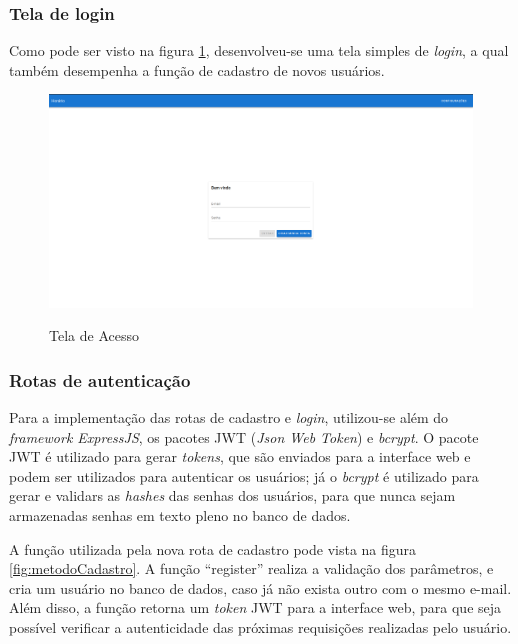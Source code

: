 \newpage
\subsubsection{Tela de login}
Como pode ser visto na figura \ref{fig:login}, desenvolveu-se uma tela simples de \textit{login}, a qual também desempenha a função de cadastro de novos usuários.

\begin{figure}[!htb]
	\centering
	\caption{Tela de Acesso}
	\includegraphics[width=1\textwidth]{./dados/figuras/telaLogin}
	\label{fig:login}
\end{figure}

\subsubsection{Rotas de autenticação}
Para a implementação das rotas de cadastro e \textit{login}, utilizou-se além do \textit{framework ExpressJS}, os pacotes JWT (\textit{Json Web Token}) e \textit{bcrypt}. O pacote JWT é utilizado para gerar \textit{tokens}, que são enviados para a interface web e podem ser utilizados para autenticar os usuários; já o \textit{bcrypt} é utilizado para gerar e validars as \textit{hashes} das senhas dos usuários, para que nunca sejam armazenadas senhas em texto pleno no banco de dados.

A função utilizada pela nova rota de cadastro pode vista na figura \ref{fig:metodoCadastro}. A função ``register'' realiza a validação dos parâmetros, e cria um usuário no banco de dados, caso já não exista outro com o mesmo e-mail. Além disso, a função retorna um \textit{token} JWT para a interface web, para que seja possível verificar a autenticidade das próximas requisições realizadas pelo usuário. 

